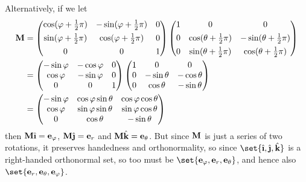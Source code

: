 \documentclass[fleqn,a4paper,11pt]{article}
\begin{document}
\begin{enumerate}
    Alternatively, if we let
    \begin{align*}
     \mathbf{M} &=
      \begin{pmatrix}
       \cos(\varphi + \tfrac 12 \pi) & -\sin(\varphi + \tfrac 12 \pi) & 0
        \\[4pt]
       \sin(\varphi + \tfrac 12 \pi) & \cos(\varphi + \tfrac 12 \pi) & 0
        \\[4pt]
       0 & 0 & 1
      \end{pmatrix}
      \begin{pmatrix}
       1 & 0 & 0 \\[4pt]
       0 & \cos(\theta + \tfrac 12 \pi) & -\sin(\theta + \tfrac 12 \pi)
        \\[4pt]
       0 & \sin(\theta + \tfrac 12 \pi) & \cos(\theta + \tfrac 12 \pi)
      \end{pmatrix} \\
      &=
      \begin{pmatrix}
       -\sin \varphi & -\cos \varphi & 0 \\
       \cos \varphi & -\sin \varphi & 0 \\
       0 & 0 & 1
      \end{pmatrix}
      \begin{pmatrix}
       1 & 0 & 0 \\
       0 & -\sin \theta & -\cos \theta \\
       0 & \cos \theta & -\sin \theta
      \end{pmatrix} \\
      &=
      \begin{pmatrix}
       -\sin \varphi & \cos \varphi \sin \theta & \cos \varphi \cos \theta \\
       \cos \varphi & \sin \varphi \sin \theta & \sin \varphi \cos \theta \\
       0 & \cos \theta & -\sin \theta
      \end{pmatrix}
    \end{align*}
    then
    \(\mat M \uveci = \vec e_\varphi\),
    \(\mat M \uvecj = \vec e_r\) and
    \(\mathbf{M} \hat{\mathrm{\mathbf{k}}} = \mathrm{\mathbf{e}}_\theta\). But since \(\mathbf{M}\) is just a series of
    two rotations, it preserves handedness and orthonormality, so since
    \(\set{\uveci, \uvecj, \uveck}\) is a right-handed orthonormal set, so too
    must be \(\set{\vec e_\varphi, \vec e_r, \vec e_\theta}\), and hence also
    \(\set{\vec e_r, \vec e_\theta, \vec e_\varphi}\).
 \end{enumerate}
\end{document}
